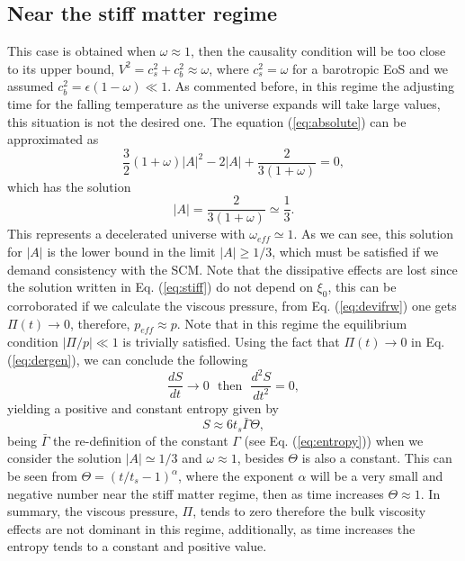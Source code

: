 \documentclass[twocolumn,showpacs,nofootinbib,floats,amsmath,amssymb]{revtex4}
\begin{document}
\subsection{Near the stiff matter regime}
This case is obtained when $\omega \approx 1$, then the causality condition will be too close to its upper bound, $V^{2}= c_{s}^{2}+c_{b}^{2} \approx \omega$, where $c_{s}^{2}=\omega$ for a barotropic EoS and we assumed $c_{b}^{2}=\epsilon \left(1-\omega \right) \ll 1$. As commented before, in this regime the adjusting time for the falling temperature as the universe expands will take large values, this situation is not the desired one. The equation (\ref{eq:absolute}) can be approximated as 
\begin{equation}
\frac{3}{2}(1+\omega)\left|A\right|^{2}-2\left|A\right|+\frac{2}{3(1+\omega)} = 0,
\end{equation}  
which has the solution 
\begin{equation}
\left|A\right| = \frac{2}{3(1+\omega)} \simeq \frac{1}{3}.
\label{eq:stiff}
\end{equation}
This represents a decelerated universe with $\omega_{eff} \simeq 1$. As we can see, this solution for $\left|A\right|$ is the lower bound in the limit $\left|A\right| \geq 1/3$, which must be satisfied if we demand consistency with the SCM. Note that the dissipative effects are lost since the solution written in Eq. (\ref{eq:stiff}) do not depend on $\xi_{0}$, this can be corroborated if we calculate the viscous pressure, from Eq. (\ref{eq:devifrw}) one gets $\Pi(t) \rightarrow 0$, therefore, $p_{eff} \approx p$.  Note that in this regime the equilibrium condition $\left|\Pi / p \right| \ll 1$ is trivially satisfied. Using the fact that $\Pi(t) \rightarrow 0$ in Eq. (\ref{eq:dergen}), we can conclude the following   
\begin{equation}
\frac{dS}{dt} \rightarrow 0 \ \ \ \mbox{then} \ \ \ \frac{d^{2}S}{dt^{2}} = 0,
\end{equation}
yielding a positive and constant entropy given by
\begin{equation}
S \approx 6t_{s}\bar{\Gamma}\Theta,
\label{eq:entro}
\end{equation}
being $\bar{\Gamma}$ the re-definition of the constant $\Gamma$ (see Eq. (\ref{eq:entropy})) when we consider the solution $\left|A\right| \simeq 1/3$ and $\omega \approx 1$, besides $\Theta$ is also a constant. This can be seen from $\Theta = (t/t_{s}-1)^{\alpha}$, where the exponent $\alpha$ will be a very small and negative number near the stiff matter regime, then as time increases $\Theta \approx 1$. In summary, the viscous pressure, $\Pi$, tends to zero therefore the bulk viscosity effects are not dominant in this regime, additionally, as time increases the entropy tends to a constant and positive value.
\end{document}
